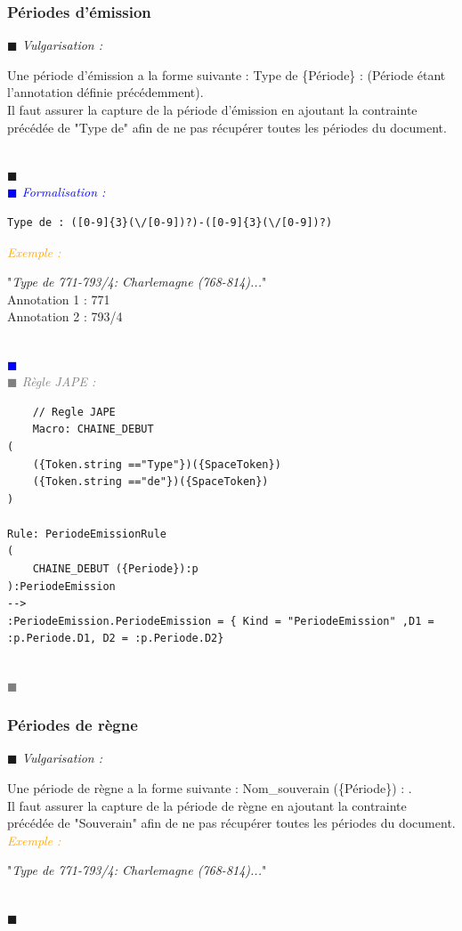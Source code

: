 \documentclass[a4paper, 11pt]{report}
\newenvironment{vulgarisation}
    {
    \textit{\textcolor{dark-blue}{$\blacksquare$  Vulgarisation : \\}}

    }
    {
    ~\\\textcolor{dark-blue}{$\blacksquare$}\\
    }
\newenvironment{formalisation}
    {
    \textit{\textcolor{blue}{$\blacksquare$  Formalisation : \\}}
    }
    {
    ~\\\textcolor{blue}{$\blacksquare$}\\
    }
\newenvironment{codage}
    {
    \textit{\textcolor{gray}{$\blacksquare$  Règle JAPE : \\}}
    }
    {
    ~\\\textcolor{gray}{$\blacksquare$}\\
    }
\newenvironment{exemple}
    {
    \textit{\textcolor{orange}{
    Exemple : \\}}
    }
    {~\\
    }
\begin{document}
\newpage
\subsubsection{Périodes d'émission}
\begin{vulgarisation}
    Une période d'émission a la forme suivante :  \og Type de \{Période\} : \fg{} (Période étant l'annotation définie précédemment).\\
    Il faut assurer la capture de la période d'émission en ajoutant la contrainte précédée de "Type de" afin de ne pas récupérer toutes les périodes du document.
\end{vulgarisation}
\begin{formalisation}
    \begin{verbatim}
Type de : ([0-9]{3}(\/[0-9])?)-([0-9]{3}(\/[0-9])?)
    \end{verbatim}
    \begin{exemple}
        "\emph{Type de 771-793/4: Charlemagne (768-814)...}" \\
        Annotation 1 : 771 \\
        Annotation 2 : 793/4
    \end{exemple}

\end{formalisation}
            \begin{codage}
    \begin{lstlisting}
    // Regle JAPE
    Macro: CHAINE_DEBUT
(
    ({Token.string =="Type"})({SpaceToken})
    ({Token.string =="de"})({SpaceToken})
)

Rule: PeriodeEmissionRule
(
    CHAINE_DEBUT ({Periode}):p
):PeriodeEmission
-->
:PeriodeEmission.PeriodeEmission = { Kind = "PeriodeEmission" ,D1 = :p.Periode.D1, D2 = :p.Periode.D2}
    \end{lstlisting}
    \end{codage}

\subsubsection{Périodes de règne}
\begin{vulgarisation}
    Une période de règne a la forme suivante : \og Nom\_souverain (\{Période\}) : \fg{}.\\
    Il faut assurer la capture de la période de règne en ajoutant la contrainte précédée de "Souverain" afin de ne pas récupérer toutes les périodes du document.\\
    \begin{exemple}
        "\emph{Type de 771-793/4: Charlemagne (768-814)...}" 
    \end{exemple}
\end{vulgarisation}
\end{document}
